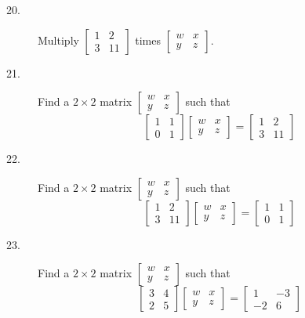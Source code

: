 \documentclass{article}
\begin{document}
\begin{description}

  \item[20.] Multiply $\begin{bmatrix} 1 & 2 \\ 3 & 11 \end{bmatrix}$ times $\begin{bmatrix} w & x \\ y & z \end{bmatrix}$. 

  \item[21.] Find a $2 \times 2$ matrix $\begin{bmatrix} w & x \\ y & z \end{bmatrix}$ such that
    \begin{equation*}
    \begin{bmatrix} 1 & 1 \\ 0 & 1 \end{bmatrix} \begin{bmatrix} w & x \\ y & z \end{bmatrix}
    = \begin{bmatrix} 1 & 2 \\ 3 & 11 \end{bmatrix} 
    \end{equation*}

  \item[22.] Find a $2 \times 2$ matrix $\begin{bmatrix} w & x \\ y & z \end{bmatrix}$ such that
    \begin{equation*}
    \begin{bmatrix} 1 & 2 \\ 3 & 11 \end{bmatrix} \begin{bmatrix} w & x \\ y & z \end{bmatrix}
    = \begin{bmatrix} 1 & 1 \\ 0 & 1 \end{bmatrix}
    \end{equation*}

  \item[23.] Find a $2 \times 2$ matrix $\begin{bmatrix} w & x \\ y & z \end{bmatrix}$ such that
    \begin{equation*}
    \begin{bmatrix} 3 & 4 \\ 2 & 5 \end{bmatrix} \begin{bmatrix} w & x \\ y & z \end{bmatrix}
    = \begin{bmatrix} 1 & -3 \\ -2 & 6 \end{bmatrix}
    \end{equation*}


\end{description}
\end{document}

